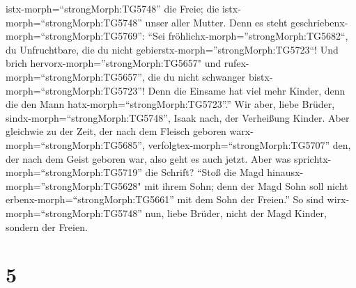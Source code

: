 istx-morph=``strongMorph:TG5748'' die Freie; die
istx-morph=``strongMorph:TG5748'' unser aller Mutter.  Denn
es steht geschriebenx-morph=``strongMorph:TG5769'': ``Sei
fröhlichx-morph=''strongMorph:TG5682``, du Unfruchtbare, die du nicht
gebierstx-morph=''strongMorph:TG5723``! Und brich
hervorx-morph=''strongMorph:TG5657" und
rufex-morph=``strongMorph:TG5657'', die du nicht schwanger
bistx-morph=``strongMorph:TG5723''! Denn die Einsame hat viel mehr
Kinder, denn die den Mann hatx-morph=``strongMorph:TG5723''.''
 Wir aber, liebe Brüder,
sindx-morph=``strongMorph:TG5748'', Isaak nach, der Verheißung Kinder.
 Aber gleichwie zu der Zeit, der nach dem Fleisch geboren
warx-morph=``strongMorph:TG5685'',
verfolgtex-morph=``strongMorph:TG5707'' den, der nach dem Geist geboren
war, also geht es auch jetzt.  Aber was
sprichtx-morph=``strongMorph:TG5719'' die Schrift? ``Stoß die Magd
hinausx-morph=''strongMorph:TG5628" mit ihrem Sohn; denn der Magd Sohn
soll nicht erbenx-morph=``strongMorph:TG5661'' mit dem Sohn der
Freien.''  So sind wirx-morph=``strongMorph:TG5748'' nun,
liebe Brüder, nicht der Magd Kinder, sondern der Freien.

\hypertarget{section-4}{%
\section{5}\label{section-4}}

